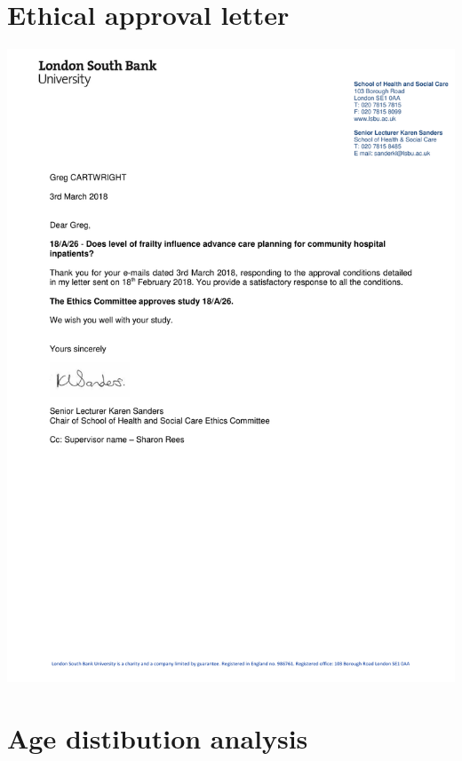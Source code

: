 \documentclass
[
	12pt,
	a4paper,
	oneside,
]{report}
\begin{document}
	\parencite[page 8]{bgs:14}

\chapter{Ethical approval letter}

\label{apx:ethics}
\includegraphics[width=\textwidth]{media/final-ethics-approval}

\chapter{Age distibution analysis}

\label{apx:dist-analysis}
\end{document}
